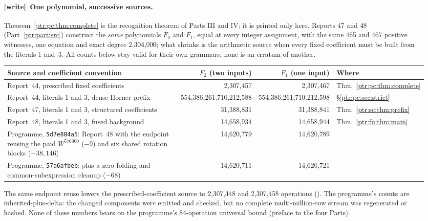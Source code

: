 \documentclass[11pt,letterpaper]{article}
\theoremstyle{definition}\newtheorem{definition}[theorem]{Definition}
\theoremstyle{remark}\newtheorem{remark}[theorem]{Remark}
\newcommand{\wtag}{\textup{[write]}}
\begin{document}
\paragraph{\wtag\ One polynomial, successive sources.} Theorem~\ref{ptr:pc:thm:complete}
is the recognition theorem of Parts III and IV; it is printed only here.
Reports 47 and 48 (Part~\ref{ptr:part:src}) construct the \emph{same}
polynomials $F_2$ and $F_1$, equal at every integer assignment, with the same
465 and 467 positive witnesses, one equation and exact degree 2,304,000; what
shrinks is the arithmetic source when every fixed coefficient must be built
from the literals 1 and~3. All counts below stay valid for their own
grammars; none is an erratum of another.
\begin{center}\small
\begin{tabular}{@{}>{\raggedright\arraybackslash}p{}rrl@{}}
\toprule
Source and coefficient convention & $F_2$ (two inputs) & $F_1$ (one input) & Where\\
\midrule
Report~44, prescribed fixed coefficients & 2,307,457 & 2,307,467 & Thm.~\ref{ptr:pc:thm:complete}\\
Report~44, literals 1 and 3, dense Horner prefix & 554,386,261,710,212,588 & 554,386,261,710,212,598 & \S\ref{ptr:pc:sec:strict}\\
Report~47, literals 1 and 3, structured coefficients & 31,388,831 & 31,388,841 & Thm.~\ref{ptr:sc:thm:prefix}\\
Report~48, literals 1 and 3, fused background & 14,658,934 & 14,658,944 & Thm.~\ref{ptr:fu:thm:main}\\
Programme, \texttt{5d7e884a5}: Report~48 with the endpoint reusing the paid $W^{576000}$ ($-9$) and six shared rotation blocks ($-38{,}146$) & 14,620,779 & 14,620,789 & \cite{ptr:w:share48}\\
Programme, \texttt{57a6afbeb}: plus a zero-folding and common-subexpression cleanup ($-68$) & 14,620,711 & 14,620,721 & \cite{ptr:w:clean48}\\
\bottomrule
\end{tabular}
\end{center}
The same endpoint reuse lowers the prescribed-coefficient source to 2,307,448
and 2,307,458 operations (). The
programme's counts are inherited-plus-delta: the changed components were
emitted and checked, but no complete multi-million-row stream was regenerated
or hashed. None of these numbers bears on the programme's 84-operation
universal bound (preface to the four Parts).
\end{document}
